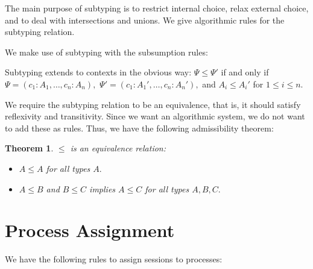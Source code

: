 \documentclass[11pt]{article}
\theoremstyle{plain}
\newtheorem{theorem}{Theorem}[section]
\theoremstyle{definition}
\theoremstyle{remark}
\DeclarePairedDelimiter\parens{(}{)}             %
\DeclarePairedDelimiter\braces{\lbrace}{\rbrace} %
\newcommand\indexVar{x}
\newcommand\sub{\le}
\newcommand\lolli{\multimap}
\newcommand\terminate{\mathbf{1}}
\newcommand\tensor{\otimes}
\newcommand\lab{lab}
\newcommand\internal{\oplus}
\newcommand\external{\&}
\newcommand\internals[2]{\internal\braces{\lab_\indexVar : {#1}_\indexVar}_{\indexVar \in #2}}
\newcommand\externals[2]{\external\braces{\lab_\indexVar : {#1}_\indexVar}_{\indexVar \in #2}}
\newcommand\irb[1]{\texttt{#1}}
\newcommand\Right{\irb{R}}
\newcommand\Left{\irb{L}}
\newcommand\Sub[1]{\text{Sub-}#1}
\newcommand{\ctx}{\Psi}
\newcommand\typeProc[3]{#1 :: \parens{#2 : #3}}
\newcommand\typeS[4]{#1 \vdash \typeProc{#2}{#3}{#4}}
\newcommand\typeSJ{\typeS{\ctx}}
\begin{document}
The main purpose of subtyping is to restrict internal choice, relax external choice, and to deal with intersections and unions. We give algorithmic rules for the subtyping relation.


We make use of subtyping with the subsumption rules:


Subtyping extends to contexts in the obvious way: $\ctx \sub \ctx'$ if and only if $\ctx = (c_1 : A_1, \ldots, c_n : A_n),$ $\ctx' = (c_1 : A_1', \ldots, c_n : A_n'),$ and $A_i \sub A_i'$ for $1 \le i \le n.$

We require the subtyping relation to be an equivalence, that is, it should satisfy reflexivity and transitivity. Since we want an algorithmic system, we do not want to add these as rules. Thus, we have the following admissibility theorem:

\begin{theorem}
  $\sub$ is an equivalence relation:
  \begin{itemize}
    \item $A \sub A$ for all types $A.$
    \item $A \sub B$ and $B \sub C$ implies $A \sub C$ for all types $A, B, C.$
  \end{itemize}
\end{theorem}

\section{Process Assignment}

We have the following rules to assign sessions to processes:
\end{document}
